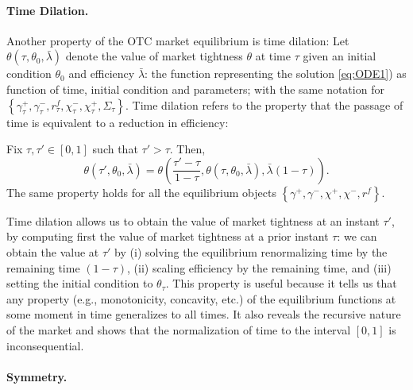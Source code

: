 \documentclass[12pt,american,english,notitlepage]{article}
\begin{document}
\paragraph{Time Dilation.}

Another property of the OTC market equilibrium is time dilation: Let
$\theta\left(\tau,\theta_{0},\bar{\lambda}\right)$ denote the value
of market tightness $\theta$ at time $\tau$ given an initial condition
$\theta_{0}$ and efficiency $\bar{\lambda}$: the function representing
the solution \eqref{eq:ODE1}) as function of time, initial condition
and parameters; with the same notation for $\left\{ \gamma_{\tau}^{+},\gamma_{\tau}^{-},r_{\tau}^{f},\chi_{\tau}^{-},\chi_{\tau}^{+},\Sigma_{\tau}\right\} $.
Time dilation refers to the property that the passage of time is equivalent
to a reduction in efficiency:
\begin{proposition}\label{prop:time-dilation} Fix
$\tau,\tau'\in\left[0,1\right]$ such that $\tau'>\tau$. Then, 
\[
\theta\left(\tau',\theta_{0},\bar{\lambda}\right)=\theta\left(\frac{\tau'-\tau}{1-\tau},\theta\left(\tau,\theta_{0},\bar{\lambda}\right),\bar{\lambda}\left(1-\tau\right)\right).
\]
The same property holds for all the equilibrium objects $\left\{ \gamma^{+},\gamma^{-},\chi^{+},\chi^{-},r^{f}\right\} $.

\end{proposition}

Time dilation allows us to obtain the value of market tightness at an
instant $\tau'$, by computing first the value of market tightness
at a prior instant $\tau$: we can obtain the value at $\tau'$ by
(i) solving the equilibrium renormalizing time by the remaining time
$\left(1-\tau\right)$, (ii) scaling efficiency by the remaining time,
and (iii) setting the initial condition to $\theta_{\tau}$. This property is useful because it tells us that any property (e.g., monotonicity,
concavity, etc.) of the equilibrium functions at some moment in time
generalizes to all times. It also reveals the recursive nature of the market and shows that the normalization of time to the interval
$\left[0,1\right]$ is inconsequential. 

\paragraph{Symmetry.}
\end{document}
